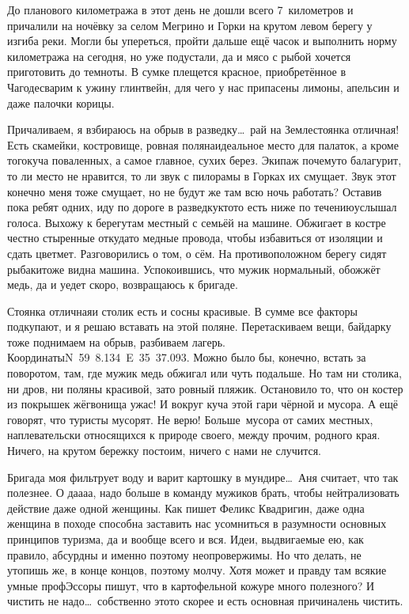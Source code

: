 До планового километража в этот день не дошли всего 7~километров и причалили на ночёвку за селом Мегрино и Горки на крутом левом берегу у изгиба реки. Могли бы упереться, пройти дальше ещё часок и выполнить норму километража на сегодня, но уже подустали, да и мясо с рыбой хочется приготовить до темноты. В сумке плещется красное, приобретённое в Чагоде\mdash сварим к ужину глинтвейн, для чего у нас припасены лимоны, апельсин и даже палочки корицы. 

Причаливаем, я взбираюсь на обрыв в разведку\ldots~рай на Земле\mdash стоянка отличная! Есть скамейки, костровище, ровная поляна\mdash идеальное место для палаток, а кроме того\mdash куча поваленных, а самое главное, сухих берез. Экипаж почему\sdash то балагурит, то ли место не нравится, то ли звук с пилорамы в Горках их смущает. Звук этот конечно меня тоже смущает, но не будут же там всю ночь работать? Оставив пока ребят одних, иду по дороге в разведку\mdash кто\sdash то есть ниже по течению\mdash услышал голоса. Выхожу к берегу\mdash там местный с семьёй на машине. Обжигает в костре честно стыренные откуда\sdash то медные провода, чтобы избавиться от изоляции и сдать цветмет. Разговорились о том, о сём. На противоположном берегу сидят рыбаки\mdash тоже видна машина. Успокоившись, что мужик нормальный, обожжёт медь, да и уедет скоро, возвращаюсь к бригаде. 

Стоянка отличная\mdash и столик есть и сосны красивые. В сумме все факторы подкупают, и я решаю вставать на этой поляне. Перетаскиваем вещи, байдарку тоже поднимаем на обрыв, разбиваем лагерь. Координаты\mdash N~59\degree~8.134\textprime ~E~35\degree~37.093\textprime. Можно было бы, конечно, встать за поворотом, там, где мужик медь обжигал или чуть подальше. Но там ни столика, ни дров, ни поляны красивой, зато ровный пляжик. Остановило то, что он костер из покрышек жёг\mdash вонища ужас! И вокруг куча этой гари чёрной и мусора. А ещё говорят, что туристы мусорят. Не верю! Больше~мусора от самих местных, наплевательски относящихся к природе своего, между прочим, родного края. Ничего, на крутом бережку постоим, ничего с нами не случится.

Бригада моя фильтрует воду и варит картошку в мундире\ldots~Аня считает, что так полезнее. О да\sdash а\sdash а\sdash а, надо больше в команду мужиков брать, чтобы нейтрализовать действие даже одной женщины. Как пишет Феликс Квадригин, даже одна женщина в походе способна заставить нас усомниться в разумности основных принципов туризма, да и вообще всего и вся. Идеи, выдвигаемые ею, как правило, абсурдны и именно поэтому неопровержимы. Но что делать, не утопишь же, в конце концов, поэтому молчу. Хотя может и правду там всякие умные профЭссоры пишут, что в картофельной кожуре много полезного? И чистить не надо\ldots~собственно это\sdash то скорее и есть основная причина\mdash лень чистить.

